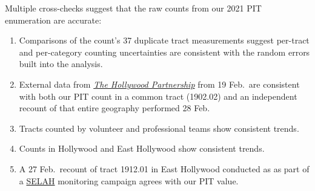 \documentclass[11pt]{article}
\def\selah{SELAH}
\begin{document}
Multiple cross-checks suggest that the raw counts from our 2021 PIT enumeration are accurate:
\begin{enumerate}
	\item Comparisons of the count's 37 duplicate tract measurements suggest per-tract and per-category
		counting uncertainties are consistent with the random errors built into the analysis.
	\item External data from \href{https://hollywoodpartnership.com/}{\it The Hollywood Partnership} 
		from 19 Feb.\ are consistent with both our PIT count in a common tract (1902.02) and an independent 
		recount of that entire geography performed 28 Feb.%
	\item Tracts counted by volunteer and professional teams show consistent trends.
	\item Counts in Hollywood and East Hollywood show consistent trends.%
	\item A 27 Feb.\ recount of tract 1912.01 in East Hollywood conducted as as part of a
		\href{https://selahnch.org}{\selah} monitoring campaign agrees with our PIT value.%
\end{enumerate}
\end{document}
